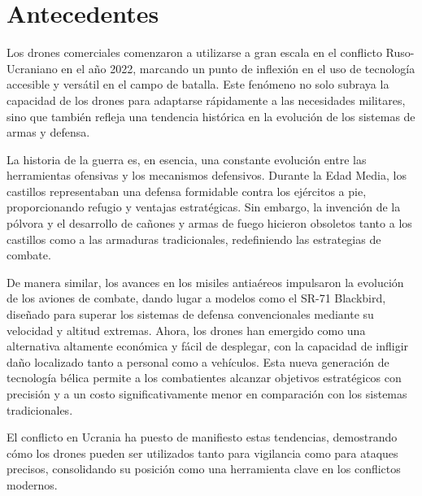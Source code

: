 \section{Antecedentes}
\label{Antecedentes}

Los drones comerciales comenzaron a utilizarse a gran escala en el conflicto Ruso-Ucraniano en el año 2022, marcando un punto de inflexión en el uso de tecnología accesible y versátil en el campo de batalla. Este fenómeno no solo subraya la capacidad de los drones para adaptarse rápidamente a las necesidades militares, sino que también refleja una tendencia histórica en la evolución de los sistemas de armas y defensa.

La historia de la guerra es, en esencia, una constante evolución entre las herramientas ofensivas y los mecanismos defensivos. Durante la Edad Media, los castillos representaban una defensa formidable contra los ejércitos a pie, proporcionando refugio y ventajas estratégicas. Sin embargo, la invención de la pólvora y el desarrollo de cañones y armas de fuego hicieron obsoletos tanto a los castillos como a las armaduras tradicionales, redefiniendo las estrategias de combate.

De manera similar, los avances en los misiles antiaéreos impulsaron la evolución de los aviones de combate, dando lugar a modelos como el SR-71 Blackbird, diseñado para superar los sistemas de defensa convencionales mediante su velocidad y altitud extremas. Ahora, los drones han emergido como una alternativa altamente económica y fácil de desplegar, con la capacidad de infligir daño localizado tanto a personal como a vehículos. Esta nueva generación de tecnología bélica permite a los combatientes alcanzar objetivos estratégicos con precisión y a un costo significativamente menor en comparación con los sistemas tradicionales.

El conflicto en Ucrania ha puesto de manifiesto estas tendencias, demostrando cómo los drones pueden ser utilizados tanto para vigilancia como para ataques precisos, consolidando su posición como una herramienta clave en los conflictos modernos.